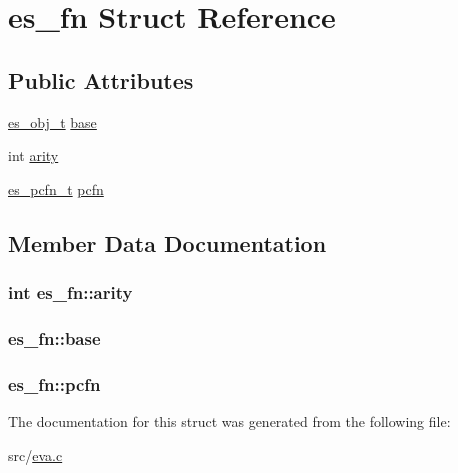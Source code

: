 \hypertarget{structes__fn}{\section{es\-\_\-fn Struct Reference}
\label{structes__fn}
}
\subsection*{Public Attributes}
\begin{DoxyCompactItemize}
\item 
\hyperlink{eva_8h_a3370a89a85f5ff467ca5e7dba47e63bc}{es\-\_\-obj\-\_\-t} \hyperlink{structes__fn_a5b99ad9ab04ec2c085a16857fc1c6c94}{base}
\item 
int \hyperlink{structes__fn_a4dec1ecfb7823628efe2b481d3b66a39}{arity}
\item 
\hyperlink{eva_8h_a0ae685bdad03568aa1065f4be036f76e}{es\-\_\-pcfn\-\_\-t} \hyperlink{structes__fn_a1ab883fc4d286107845de80b9fb12657}{pcfn}
\end{DoxyCompactItemize}


\subsection{Member Data Documentation}
\hypertarget{structes__fn_a4dec1ecfb7823628efe2b481d3b66a39}{
\subsubsection[{arity}]{\setlength{\rightskip}{0pt plus 5cm}int es\-\_\-fn\-::arity}}\label{structes__fn_a4dec1ecfb7823628efe2b481d3b66a39}
\hypertarget{structes__fn_a5b99ad9ab04ec2c085a16857fc1c6c94}{
\subsubsection[{base}]{ es\-\_\-fn\-::base}}\label{structes__fn_a5b99ad9ab04ec2c085a16857fc1c6c94}
\hypertarget{structes__fn_a1ab883fc4d286107845de80b9fb12657}{
\subsubsection[{pcfn}]{ es\-\_\-fn\-::pcfn}}\label{structes__fn_a1ab883fc4d286107845de80b9fb12657}


The documentation for this struct was generated from the following file\-:\begin{DoxyCompactItemize}
\item 
src/\hyperlink{eva_8c}{eva.\-c}\end{DoxyCompactItemize}

